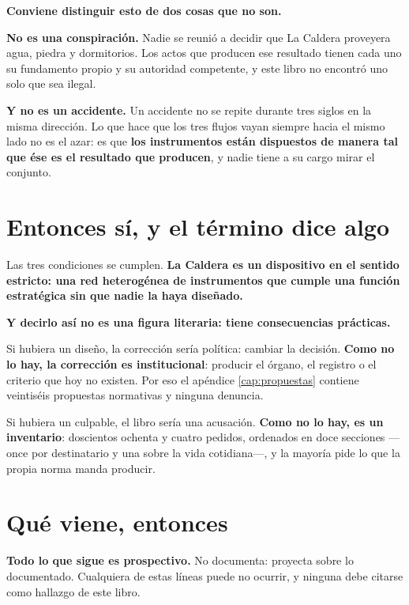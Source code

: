 \begin{cautela}
\textbf{Conviene distinguir esto de dos cosas que no son.}

\textbf{No es una conspiración.} Nadie se reunió a decidir que La Caldera proveyera agua, piedra
y dormitorios. Los actos que producen ese resultado tienen cada uno su fundamento propio y su
autoridad competente, y este libro no encontró uno solo que sea ilegal.

\textbf{Y no es un accidente.} Un accidente no se repite durante tres siglos en la misma
dirección. Lo que hace que los tres flujos vayan siempre hacia el mismo lado no es el azar: es
que \textbf{los instrumentos están dispuestos de manera tal que ése es el resultado que
producen}, y nadie tiene a su cargo mirar el conjunto.
\end{cautela}

\section{Entonces sí, y el término dice algo}

Las tres condiciones se cumplen. \textbf{La Caldera es un dispositivo en el sentido estricto: una
red heterogénea de instrumentos que cumple una función estratégica sin que nadie la haya
diseñado.}

\textbf{Y decirlo así no es una figura literaria: tiene consecuencias prácticas.}

Si hubiera un diseño, la corrección sería política: cambiar la decisión. \textbf{Como no lo hay,
la corrección es institucional}: producir el órgano, el registro o el criterio que hoy no
existen. Por eso el apéndice \ref{cap:propuestas} contiene veintiséis propuestas normativas y
ninguna denuncia.

Si hubiera un culpable, el libro sería una acusación. \textbf{Como no lo hay, es un inventario}:
doscientos ochenta y cuatro pedidos, ordenados en doce secciones ---once por destinatario y una sobre la vida cotidiana---, y la mayoría pide lo que la propia norma
manda producir.

\section{Qué viene, entonces}

\begin{cautela}
\textbf{Todo lo que sigue es prospectivo.} No documenta: proyecta sobre lo documentado.
Cualquiera de estas líneas puede no ocurrir, y ninguna debe citarse como hallazgo de este libro.
\end{cautela}

